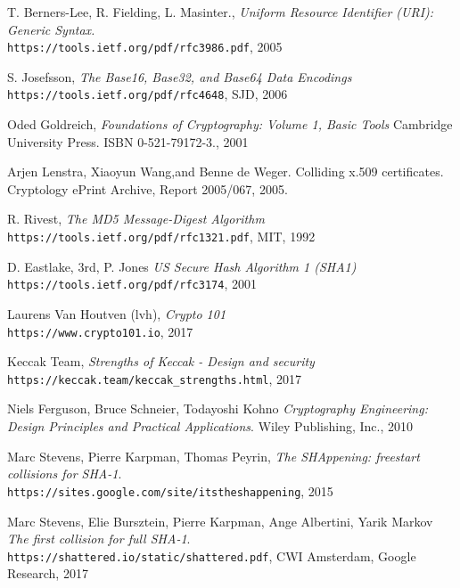 \begin{thebibliography}{9}

T. Berners-Lee, R. Fielding, L. Masinter.,
\textit{Uniform Resource Identifier (URI): Generic Syntax.} \\ 
\texttt{https://tools.ietf.org/pdf/rfc3986.pdf}, 2005

S. Josefsson,
\textit{The Base16, Base32, and Base64 Data Encodings} \\ 
\texttt{https://tools.ietf.org/pdf/rfc4648}, SJD, 2006

Oded Goldreich,
\textit{Foundations of Cryptography: Volume 1, Basic Tools}  
Cambridge University Press. ISBN 0-521-79172-3., 2001

Arjen Lenstra, Xiaoyun Wang,and Benne de Weger. Colliding
x.509 certificates. Cryptology ePrint Archive, Report 2005/067,
2005.

R. Rivest,
\textit{The MD5 Message-Digest Algorithm} \\ 
\texttt{https://tools.ietf.org/pdf/rfc1321.pdf}, MIT, 1992

D. Eastlake, 3rd, P. Jones
\textit{US Secure Hash Algorithm 1 (SHA1)} \\ 
\texttt{https://tools.ietf.org/pdf/rfc3174}, 2001

Laurens Van Houtven (lvh),
\textit{Crypto 101} \\ 
\texttt{https://www.crypto101.io}, 2017

Keccak Team,
\textit{Strengths of Keccak - Design and security} \\ 
\texttt{https://keccak.team/keccak\_strengths.html}, 2017

Niels Ferguson, Bruce Schneier, Todayoshi Kohno
\textit{Cryptography Engineering: Design Principles and Practical Applications}. Wiley Publishing, Inc., 2010

Marc Stevens, Pierre Karpman, Thomas Peyrin,
\textit{The SHAppening: freestart collisions for SHA-1}. \\
\texttt{https://sites.google.com/site/itstheshappening}, 2015

Marc Stevens, Elie Bursztein, Pierre Karpman, Ange Albertini, Yarik Markov
\textit{The first collision for full SHA-1}. \\
\texttt{https://shattered.io/static/shattered.pdf}, CWI Amsterdam, Google Research, 2017


\end{thebibliography}
